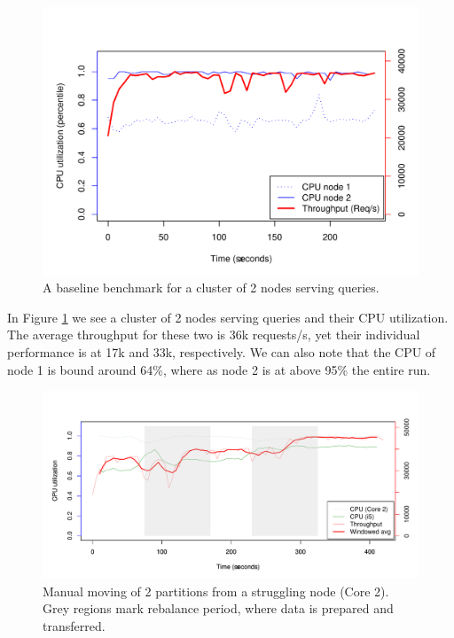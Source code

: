 \begin{figure}[h]
    \centering
    \includegraphics[width=1.0\textwidth]{results/baseline_slowpro_mini}
    \caption{A baseline benchmark for a cluster of 2 nodes serving queries.}
    \label{fig:adaptive_base}
\end{figure}

In Figure \ref{fig:adaptive_base} we see a cluster of 2 nodes serving queries and their CPU utilization. The average throughput for these two is 36k requests/s, yet their individual performance is at 17k and 33k, respectively. We can also note that the CPU of node 1 is bound around 64\%, where as node 2 is at above 95\% the entire run.

\clearpage
\begin{figure}[h]
    \centering
    \includegraphics[width=1.2\textwidth]{results/rebalance_manual_2node}
    \caption{Manual moving of 2 partitions from a struggling node (Core 2). Grey regions mark rebalance period, where data is prepared and transferred.}
    \label{fig:adaptive_man}
\end{figure}

